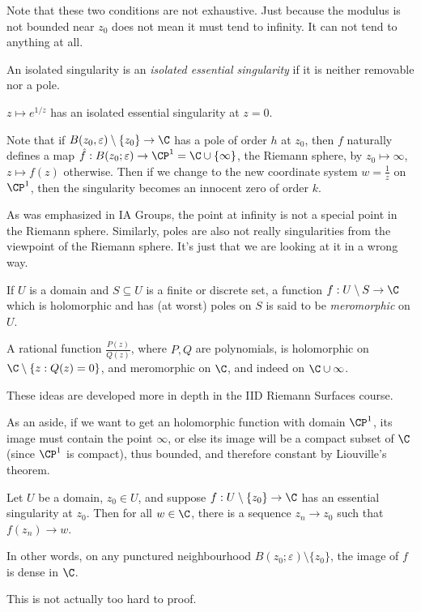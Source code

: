 \documentclass[a4paper]{article}
\begin{document}
Note that these two conditions are not exhaustive. Just because the modulus is not bounded near $z_0$ does not mean it must tend to infinity. It can not tend to anything at all.
\begin{defi}
  An isolated singularity is an \emph{isolated essential singularity} if it is neither removable nor a pole.
\end{defi}
\begin{eg}
  $z \mapsto e^{1/z}$ has an isolated essential singularity at $z = 0$.
\end{eg}

Note that if $B(z_0, \varepsilon) \setminus \{z_0\} \to \C$ has a pole of order $h$ at $z_0$, then $f$ naturally defines a map $\hat{f}: B (z_0; \varepsilon) \to \CP^1 = \C\cup \{\infty\}$, the Riemann sphere, by $z_0 \mapsto \infty$, $z \mapsto f(z)$ otherwise. Then if we change to the new coordinate system $w = \frac{1}{z}$ on $\CP^1$, then the singularity becomes an innocent zero of order $k$.

As was emphasized in IA Groups, the point at infinity is not a special point in the Riemann sphere. Similarly, poles are also not really singularities from the viewpoint of the Riemann sphere. It's just that we are looking at it in a wrong way.

\begin{defi}
  If $U$ is a domain and $S \subseteq U$ is a finite or discrete set, a function $f: U \setminus S \to \C$ which is holomorphic and has (at worst) poles on $S$ is said to be \emph{meromorphic} on $U$.
\end{defi}

\begin{eg}
  A rational function $\frac{P(z)}{Q(z)}$, where $P, Q$ are polynomials, is holomorphic on $\C \setminus \{z: Q(z) = 0\}$, and meromorphic on $\C$, and indeed on $\C \cup \infty$.
\end{eg}
These ideas are developed more in depth in the IID Riemann Surfaces course.

As an aside, if we want to get an holomorphic function with domain $\CP^1$, its image must contain the point $\infty$, or else its image will be a compact subset of $\C$ (since $\CP^1$ is compact), thus bounded, and therefore constant by Liouville's theorem.

\begin{thm}
  Let $U$ be a domain, $z_0 \in U$, and suppose $f: U \setminus \{z_0\} \to \C$ has an essential singularity at $z_0$. Then for all $w \in \C$, there is a sequence $z_n \to z_0$ such that $f(z_n) \to w$.

  In other words, on any punctured neighbourhood $B(z_0; \varepsilon) \setminus \{z_0\}$, the image of $f$ is dense in $\C$.
\end{thm}
This is not actually too hard to proof.
\end{document}
